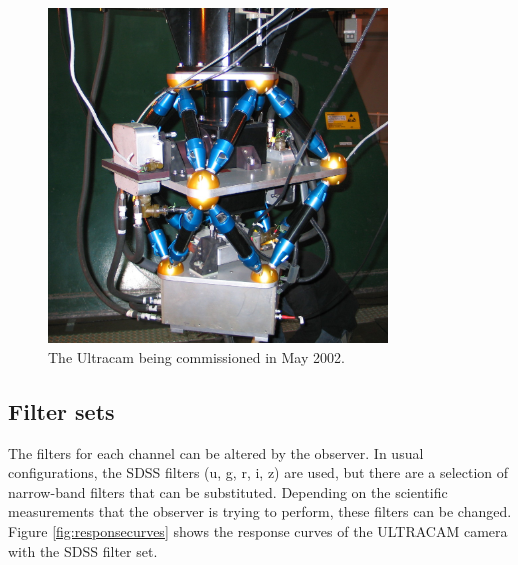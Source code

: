 \begin{figure}
\centering
\includegraphics[width=90mm]{images/IMG_0121_scaled.JPG}
\caption{The Ultracam being commissioned in May 2002.}
\label{fig:ultracam}
\end{figure}

\subsection{Filter sets}
The filters for each channel can be altered by the observer. In usual configurations, the SDSS filters (u, g, r, i, z) are used, but there are a selection of narrow-band filters that can be substituted. Depending on the scientific measurements that the observer is trying to perform, these filters can be changed. Figure \ref{fig:responsecurves} shows the response curves of the ULTRACAM camera with the SDSS filter set. 


